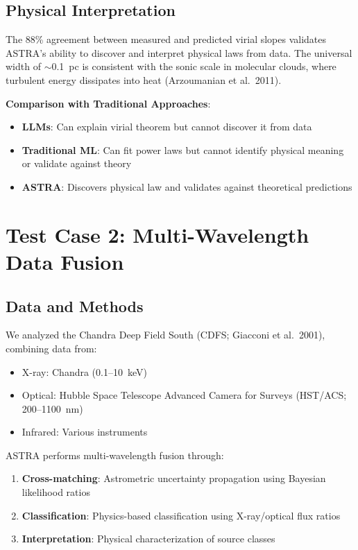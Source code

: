 \documentclass[usenatbib]{rasti}
\begin{document}
\subsection{Physical Interpretation}

The 88\% agreement between measured and predicted virial slopes validates ASTRA's ability to discover and interpret physical laws from data. The universal width of $\sim$0.1~pc is consistent with the sonic scale in molecular clouds, where turbulent energy dissipates into heat (Arzoumanian et al.~2011)\cite{arzoumanian2011}.

\textbf{Comparison with Traditional Approaches}:
\begin{itemize}
\item \textbf{LLMs}: Can explain virial theorem but cannot discover it from data
\item \textbf{Traditional ML}: Can fit power laws but cannot identify physical meaning or validate against theory
\item \textbf{ASTRA}: Discovers physical law and validates against theoretical predictions
\end{itemize}

\section{Test Case 2: Multi-Wavelength Data Fusion}

\subsection{Data and Methods}

We analyzed the Chandra Deep Field South (CDFS; Giacconi et al.~2001)\cite{giacconi2001}, combining data from:
\begin{itemize}
\item X-ray: Chandra (0.1--10~keV)
\item Optical: Hubble Space Telescope Advanced Camera for Surveys (HST/ACS; 200--1100~nm)
\item Infrared: Various instruments
\end{itemize}

ASTRA performs multi-wavelength fusion through:
\begin{enumerate}
\item \textbf{Cross-matching}: Astrometric uncertainty propagation using Bayesian likelihood ratios
\item \textbf{Classification}: Physics-based classification using X-ray/optical flux ratios
\item \textbf{Interpretation}: Physical characterization of source classes
\end{enumerate}
\end{document}
